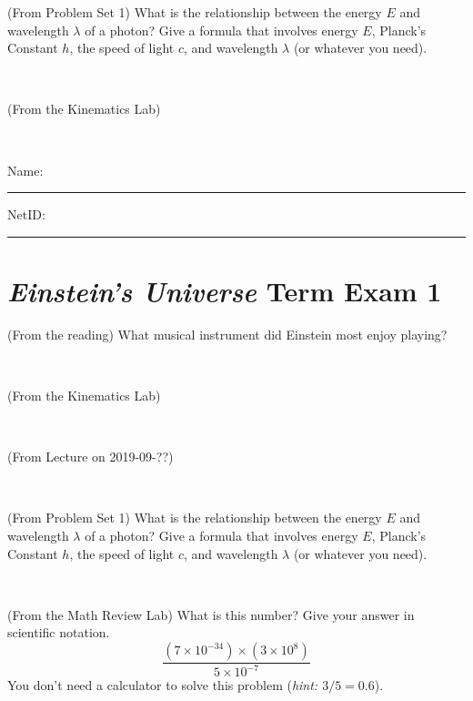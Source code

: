 \documentclass[12pt, letterpaper]{article}
\begin{document}
\begin{problem} (From Problem Set 1)
What is the relationship between the energy $E$ and wavelength
$\lambda$ of a photon? Give a formula that involves energy $E$,
Planck's Constant $h$, the speed of light $c$, and wavelength
$\lambda$ (or whatever you need).
\end{problem}

\vfill ~

\begin{problem} (From the Kinematics Lab)

\end{problem}


\vfill ~


\cleardoublepage



\noindent
Name: \rule[-1ex]{0.60\textwidth}{0.1pt}
NetID: \rule[-1ex]{0.20\textwidth}{0.1pt}

\section*{\textsl{Einstein's Universe} Term Exam 1}
\setcounter{problem}{1}


\begin{problem} (From the reading)
What musical instrument did Einstein most enjoy playing?
\end{problem}


\vfill ~

\begin{problem} (From the Kinematics Lab)

\end{problem}


\vfill ~

\begin{problem} (From Lecture on 2019-09-??)
\end{problem}


\vfill ~

\begin{problem} (From Problem Set 1)
What is the relationship between the energy $E$ and wavelength
$\lambda$ of a photon? Give a formula that involves energy $E$,
Planck's Constant $h$, the speed of light $c$, and wavelength
$\lambda$ (or whatever you need).
\end{problem}

\vfill ~


\clearpage


\begin{problem} (From the Math Review Lab)
What is this number? Give your answer in scientific notation.
$$
\frac{(7\times10^{-34})\times(3\times10^8)}{5\times10^{-7}}
$$
You don't need a calculator to solve this problem (\textit{hint: $3/5=0.6$}).
\end{problem}
\end{document}
